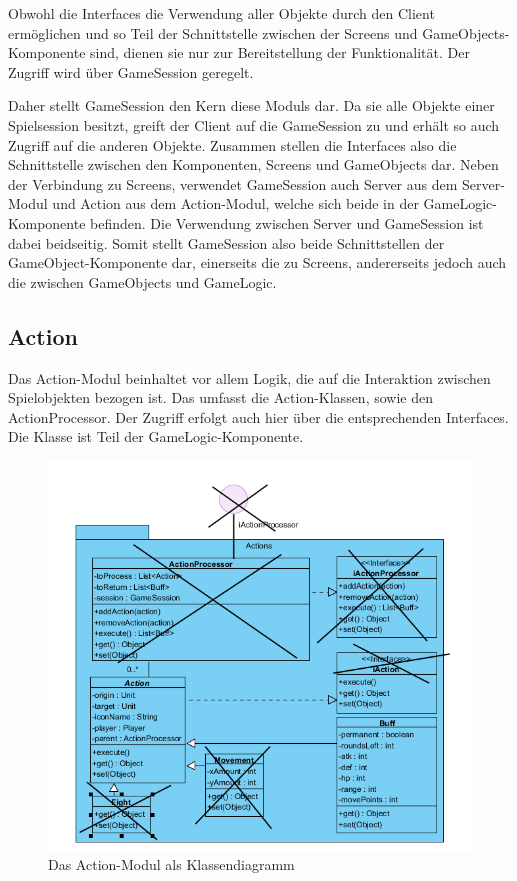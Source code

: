 \documentclass[fontsize=12pt,paper=a4,twoside]{scrartcl}
\begin{document}
Obwohl die Interfaces die Verwendung aller Objekte durch den Client ermöglichen und so Teil der Schnittstelle zwischen der Screens und GameObjects-Komponente sind, dienen sie nur zur Bereitstellung der Funktionalität. Der Zugriff wird über GameSession geregelt.

Daher stellt GameSession den Kern diese Moduls dar. Da sie alle Objekte einer Spielsession besitzt, greift der Client auf die GameSession zu und erhält so auch Zugriff auf die anderen Objekte. Zusammen stellen die Interfaces also die Schnittstelle zwischen den Komponenten, Screens und GameObjects dar. Neben der Verbindung zu Screens, verwendet GameSession auch Server aus dem Server-Modul und Action aus dem Action-Modul, welche sich beide in der GameLogic-Komponente befinden. Die Verwendung zwischen Server und GameSession ist dabei beidseitig. Somit stellt GameSession also beide Schnittstellen der GameObject-Komponente dar, einerseits die zu Screens, andererseits jedoch auch die zwischen GameObjects und GameLogic.

\subsection{Action}
Das Action-Modul beinhaltet vor allem Logik, die auf die Interaktion zwischen Spielobjekten bezogen ist. Das umfasst die Action-Klassen, sowie den ActionProcessor. Der Zugriff erfolgt auch hier über die entsprechenden Interfaces. Die Klasse ist Teil der GameLogic-Komponente.

\begin{figure}[h]
\centering
\includegraphics[width=1.0\linewidth]{ActionClass}
\caption{Das Action-Modul als Klassendiagramm}
\label{fig:ActionClass}
\end{figure}
\end{document}
